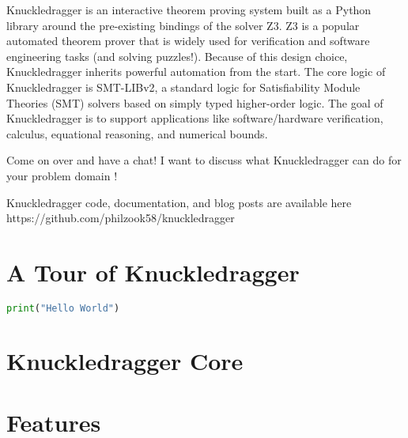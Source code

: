 \documentclass{article}%
\begin{document}
Knuckledragger is an interactive theorem proving system built as a Python library around the pre-existing bindings of the solver Z3. Z3 is a popular automated theorem prover that is widely used for verification and software engineering tasks (and solving puzzles!). Because of this design choice, Knuckledragger inherits powerful automation from the start. The core logic of Knuckledragger is SMT-LIBv2, a standard logic for Satisfiability Module Theories (SMT) solvers based on simply typed higher-order logic. The goal of Knuckledragger is to support applications like software/hardware verification, calculus, equational reasoning, and numerical bounds.

Come on over and have a chat! I want to discuss what Knuckledragger can do for your problem domain !

Knuckledragger code, documentation, and blog posts are available here https://github.com/philzook58/knuckledragger





\section{A Tour of Knuckledragger}

\begin{lstlisting}[language=Python, caption=Example]
    print("Hello World")
\end{lstlisting}

\section{Knuckledragger Core}

\section{Features}
\end{document}

